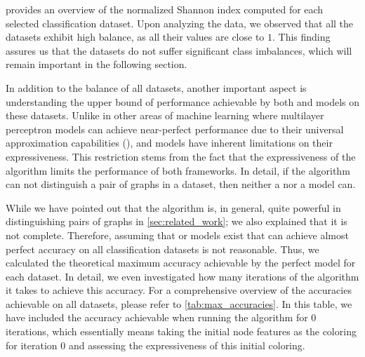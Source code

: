  provides an overview of the normalized Shannon index computed for each selected classification dataset. Upon analyzing the data, we observed that all the datasets exhibit high balance, as all their values are close to $1$. This finding assures us that the datasets do not suffer significant class imbalances, which will remain important in the following section.

In addition to the balance of all datasets, another important aspect is understanding the upper bound of performance achievable by both \gnn and \wlnn models on these datasets. Unlike in other areas of machine learning where multilayer perceptron models can achieve near-perfect performance due to their universal approximation capabilities (\cite{Hornik1991}), \gnn and \wlnn models have inherent limitations on their expressiveness. This restriction stems from the fact that the expressiveness of the \wl algorithm limits the performance of both frameworks. In detail, if the \wl algorithm can not distinguish a pair of graphs in a dataset, then neither a \gnn nor a \wlnn model can.

While we have pointed out that the \wl algorithm is, in general, quite powerful in distinguishing pairs of graphs in \cref{sec:related_work}; we also explained that it is not complete. Therefore, assuming that \gnn or \wlnn models exist that can achieve almost perfect accuracy on all classification datasets is not reasonable. Thus, we calculated the theoretical maximum accuracy achievable by the perfect model for each dataset. In detail, we even investigated how many iterations of the \wl algorithm it takes to achieve this accuracy. For a comprehensive overview of the accuracies achievable on all datasets, please refer to \cref{tab:max_accuracies}. In this table, we have included the accuracy achievable when running the \wl algorithm for $0$ iterations, which essentially means taking the initial node features as the coloring for iteration $0$ and assessing the expressiveness of this initial coloring.

